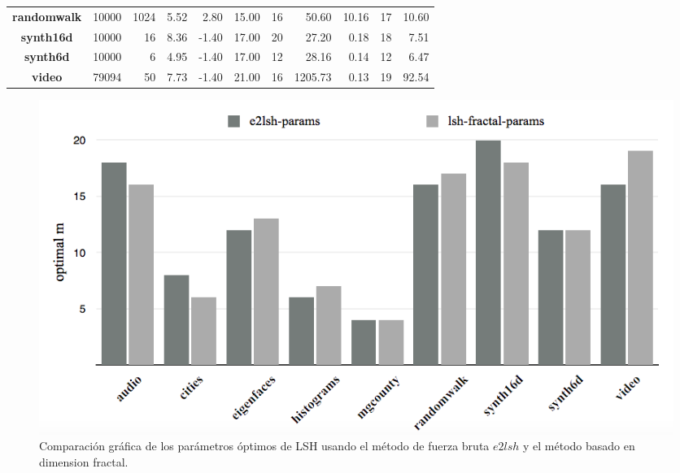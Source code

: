 \begin{table}[!t]
\begin{footnotesize}
\begin{tabular}{c|r|r|r|r|r|r|r|r|r|r|}
\multicolumn{1}{|c|}{\bf randomwalk}            & 10000                 & 1024     & 5.52     & 2.80       & 15.00       & \cellcolor[HTML]{f2f2f2}16                        & \cellcolor[HTML]{f2f2f2}50.60     & 10.16 & \cellcolor[HTML]{DFDFDF}17                    & \cellcolor[HTML]{DFDFDF}10.60                   \\
\multicolumn{1}{|c|}{\bf synth16d}              & 10000                 & 16       & 8.36     & -1.40      & 17.00       & \cellcolor[HTML]{f2f2f2}20                        & \cellcolor[HTML]{f2f2f2}27.20     & 0.18  & \cellcolor[HTML]{DFDFDF}18                    & \cellcolor[HTML]{DFDFDF}7.51                   \\
\multicolumn{1}{|c|}{\bf synth6d}               & 10000                 & 6        & 4.95     & -1.40      & 17.00       & \cellcolor[HTML]{f2f2f2}12                        & \cellcolor[HTML]{f2f2f2}28.16      & 0.14  & \cellcolor[HTML]{DFDFDF}12                    & \cellcolor[HTML]{DFDFDF}6.47                    \\
\multicolumn{1}{|c|}{\bf video}                 & 79094                 & 50       & 7.73     & -1.40      & 21.00       & \cellcolor[HTML]{f2f2f2}16                        & \cellcolor[HTML]{f2f2f2}1205.73     & 0.13  & \cellcolor[HTML]{DFDFDF}19                    & \cellcolor[HTML]{DFDFDF}92.54                   \\ 
\hline
\end{tabular}
\end{footnotesize}
\end{table}
\begin{figure}[htp]\centering
\includegraphics[width=0.9\columnwidth]{chapter6/fractal-params.png}
\caption{Comparación gráfica de los parámetros óptimos  de LSH usando el método de fuerza bruta $e2lsh$ y el método basado en dimension fractal.}
\label{fig:fractal-params}
\end{figure}    
